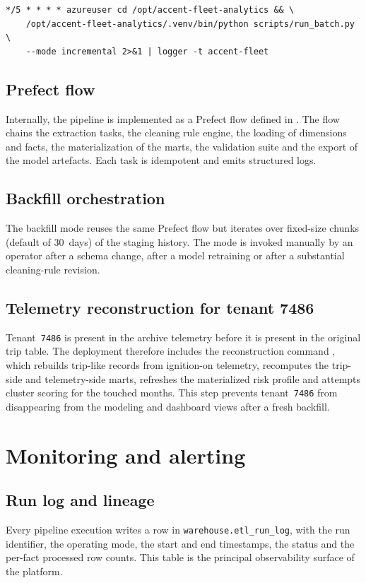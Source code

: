 \begin{lstlisting}[style=bash,caption={Cron entry triggering the incremental pipeline every five minutes.},label={lst:cron}]
*/5 * * * * azureuser cd /opt/accent-fleet-analytics && \
    /opt/accent-fleet-analytics/.venv/bin/python scripts/run_batch.py \
    --mode incremental 2>&1 | logger -t accent-fleet
\end{lstlisting}

\subsection{Prefect flow}
Internally, the pipeline is implemented as a Prefect flow defined in . The flow chains the extraction tasks, the cleaning rule engine, the loading of dimensions and facts, the materialization of the marts, the validation suite and the export of the model artefacts. Each task is idempotent and emits structured logs.

\subsection{Backfill orchestration}
The backfill mode reuses the same Prefect flow but iterates over fixed-size chunks (default of 30~days) of the staging history. The mode is invoked manually by an operator after a schema change, after a model retraining or after a substantial cleaning-rule revision.

\subsection{Telemetry reconstruction for tenant 7486}
Tenant~\texttt{7486} is present in the archive telemetry before it is present in the original trip table. The deployment therefore includes the reconstruction command , which rebuilds trip-like records from ignition-on telemetry, recomputes the trip-side and telemetry-side marts, refreshes the materialized risk profile and attempts cluster scoring for the touched months. This step prevents tenant~\texttt{7486} from disappearing from the modeling and dashboard views after a fresh backfill.

\section{Monitoring and alerting}

\subsection{Run log and lineage}
Every pipeline execution writes a row in \texttt{warehouse.etl\_run\_log}, with the run identifier, the operating mode, the start and end timestamps, the status and the per-fact processed row counts. This table is the principal observability surface of the platform.

